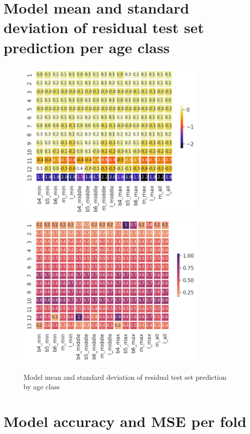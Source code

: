 \documentclass[10pt,letterpaper]{article}
\begin{document}
\pagebreak

\section{Model mean and standard deviation of residual test set prediction per age class}

\begin{figure}[h!]
  \caption{Model mean and standard deviation of residual test set prediction by age class}
  \centering
  \includegraphics[width=0.82\textwidth]{results/eda/age_mean.png}
  \includegraphics[width=0.82\textwidth]{results/eda/age_std.png}
  \label{marker14}
\end{figure}

\pagebreak

\section{Model accuracy and MSE per fold}
\end{document}
